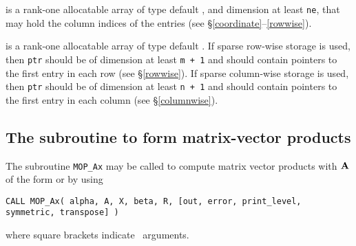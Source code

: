 \documentclass{galahad}
\newcommand{\packagename}{MOP}
\begin{document}
\begin{description}
 is a rank-one allocatable array of type default \integer, 
and dimension at least {\tt ne}, that may hold the column indices of the entries
(see \S\ref{coordinate}--\ref{rowwise}).

 is a rank-one allocatable array of type default \integer.
If sparse row-wise storage is used, then {\tt ptr} should be of
dimension at least {\tt m + 1} and should contain pointers to the
first entry in each row (see \S\ref{rowwise}). If sparse column-wise
storage is used, then {\tt ptr} should be of dimension at least {\tt n
  + 1} and should contain pointers to the first entry in each column (see
\S\ref{columnwise}).

\end{description}


\subsection{The subroutine to form matrix-vector products}\label{Ax}

The subroutine {\tt \packagename\_Ax} may be called to compute matrix
vector products with ${\mathbf{A}}$ of the form
or
by using
\vspace*{1mm}

\hspace{8mm}
{\tt CALL \packagename\_Ax( alpha, A, X, beta, R, [out, error,
                            print\_level, symmetric, transpose] )}

\vspace*{1mm}
\noindent where square brackets indicate \optional\ arguments. 
\end{document}
